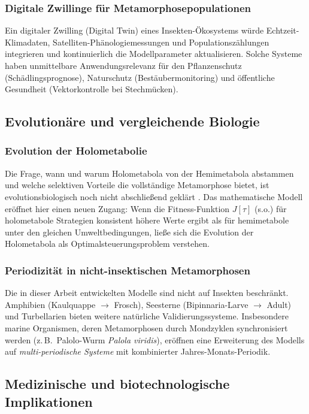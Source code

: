 ﻿\documentclass[12pt, a4paper]{article}
\theoremstyle{definition}
\begin{document}
\subsubsection{Digitale Zwillinge für Metamorphosepopulationen}
Ein digitaler Zwilling (Digital Twin) eines Insekten-Ökosystems würde
Echtzeit-Klimadaten, Satelliten-Phänologiemessungen und Populationszählungen
integrieren und kontinuierlich die Modellparameter aktualisieren. Solche Systeme
haben unmittelbare Anwendungsrelevanz für den Pflanzenschutz (Schädlingsprognose),
Naturschutz (Bestäubermonitoring) und öffentliche Gesundheit (Vektorkontrolle
bei Stechmücken).

\subsection{Evolutionäre und vergleichende Biologie}

\subsubsection{Evolution der Holometabolie}
Die Frage, wann und warum Holometabola von der Hemimetabola abstammen und welche
selektiven Vorteile die vollständige Metamorphose bietet, ist evolutionsbiologisch
noch nicht abschließend geklärt \cite{Truman2019}. Das mathematische Modell eröffnet
hier einen neuen Zugang: Wenn die Fitness-Funktion $J[\tau]$ (s.o.) für
holometabole Strategien konsistent höhere Werte ergibt als für hemimetabole unter
den gleichen Umweltbedingungen, ließe sich die Evolution der Holometabola als
Optimalsteuerungsproblem verstehen.

\subsubsection{Periodizität in nicht-insektischen Metamorphosen}
Die in dieser Arbeit entwickelten Modelle sind nicht auf Insekten beschränkt.
Amphibien (Kaulquappe $\to$ Frosch), Seesterne (Bipinnaria-Larve $\to$ Adult)
und Turbellarien bieten weitere natürliche Validierungssysteme. Insbesondere
marine Organismen, deren Metamorphosen durch Mondzyklen synchronisiert werden
(z.\,B.\ Palolo-Wurm \emph{Palola viridis}), eröffnen eine Erweiterung des
Modells auf \emph{multi-periodische Systeme} mit kombinierter Jahres-Monats-Periodik.

\subsection{Medizinische und biotechnologische Implikationen}
\end{document}
